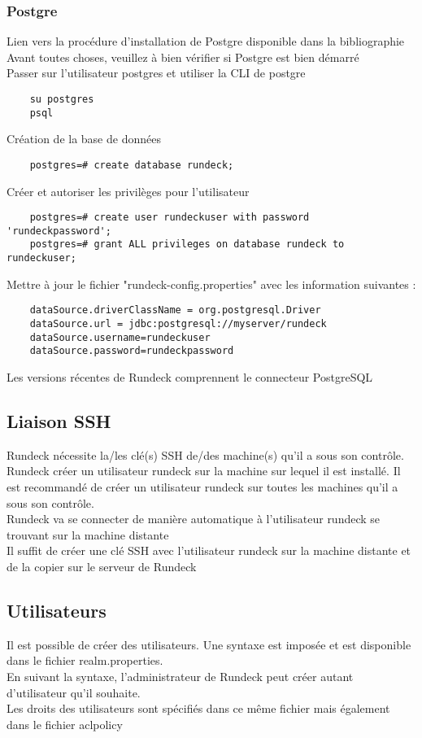 \documentclass[12pt]{article}
\begin{document}
\subsubsection{Postgre}
Lien vers la procédure d'installation de Postgre disponible dans la bibliographie
\\
Avant toutes choses, veuillez à bien vérifier si Postgre est bien démarré
\\
Passer sur l'utilisateur postgres et utiliser la CLI de postgre
\begin{lstlisting}
    su postgres
    psql
\end{lstlisting}
Création de la base de données
\begin{lstlisting}
    postgres=# create database rundeck;
\end{lstlisting}
Créer et autoriser les privilèges pour l'utilisateur
\begin{lstlisting}
    postgres=# create user rundeckuser with password 'rundeckpassword';
    postgres=# grant ALL privileges on database rundeck to rundeckuser;
\end{lstlisting}
Mettre à jour le fichier "rundeck-config.properties" avec les information suivantes :
\begin{lstlisting}
    dataSource.driverClassName = org.postgresql.Driver
    dataSource.url = jdbc:postgresql://myserver/rundeck
    dataSource.username=rundeckuser
    dataSource.password=rundeckpassword
\end{lstlisting}
Les versions récentes de Rundeck comprennent le connecteur PostgreSQL

\subsection{Liaison SSH}
Rundeck nécessite la/les clé(s) SSH de/des machine(s) qu'il a sous son contrôle. Rundeck créer un utilisateur rundeck sur la machine sur lequel il est installé. Il est recommandé de créer un utilisateur rundeck sur toutes les machines qu'il a sous son contrôle.
\\
Rundeck va se connecter de manière automatique à l'utilisateur rundeck se trouvant sur la machine distante
\\
Il suffit de créer une clé SSH avec l'utilisateur rundeck sur la machine distante et de la copier sur le serveur de Rundeck

\subsection{Utilisateurs}
Il est possible de créer des utilisateurs. Une syntaxe est imposée et est disponible dans le fichier realm.properties.
\\
En suivant la syntaxe, l'administrateur de Rundeck peut créer autant d'utilisateur qu'il souhaite.
\\
Les droits des utilisateurs sont spécifiés dans ce même fichier mais également dans le fichier aclpolicy
\end{document}
